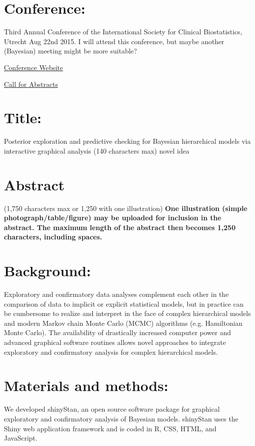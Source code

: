 \documentclass[11pt,notitlepage]{article}
\begin{document}
\section*{Conference:}

Third Annual Conference of the International Society for Clinical Biostatistics, Utrecht Aug 22nd 2015. I will attend this conference, but maybe another (Bayesian) meeting might be more suitable?

\href{http://www.iscb.info/ISCB2015.html}{Conference Website}

\href{http://www.iscb2015.info/abstract-submission}{Call for Abstracts}



\section*{Title:}

Posterior exploration and predictive checking for Bayesian hierarchical models via interactive graphical analysis (140 characters max) novel idea
\section*{Abstract}
(1,750 characters max or 1,250 with one illustration) \textbf{One illustration (simple photograph/table/figure) may be uploaded for inclusion in the abstract. The maximum length of the abstract then becomes 1,250 characters, including spaces.}

\section*{Background:}
Exploratory and confirmatory data analyses complement each other in the comparison of data to implicit or explicit statistical models, but in practice can be cumbersome to realize and interpret in the face of complex hierarchical models and modern Markov chain Monte Carlo (MCMC) algorithms (e.g. Hamiltonian Monte Carlo). The availability of drastically increased computer power and advanced graphical software routines allows novel approaches to integrate exploratory and confirmatory analysis for complex hierarchical models.
  
\section*{Materials and methods:}
We developed shinyStan, an open source software package for graphical exploratory and confirmatory analysis of Bayesian models. shinyStan uses the Shiny web application framework and is coded in R, CSS, HTML, and JavaScript.  
\end{document}
